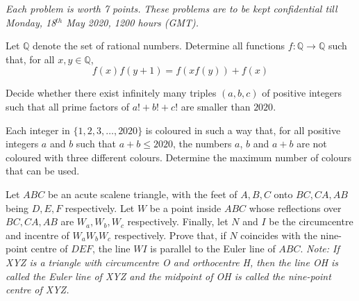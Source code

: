 \documentclass{qmo}
\date{May 17th, 2020}
\begin{document}
\maketitle
\begin{flushright}
\emph{Each problem is worth 7 points.}\nl
\emph{These problems are to be kept confidential till Monday, 18$^\mathit{th}$ May 2020, 1200 hours (GMT).}
\end{flushright}
\setcounter{problem}{4}
\begin{problem}
	Let $\mathbb{Q}$ denote the set of rational numbers. Determine all functions $f\colon \mathbb{Q}\to \mathbb{Q}$ such that, for all $x,y\in \mathbb{Q}$,
	\[f(x) f(y + 1) = f(x f(y)) + f(x)\]
\end{problem}

\begin{problem}	
	Decide whether there exist infinitely many triples $(a,b,c)$ of positive integers such that all prime factors of $a!+b!+c!$ are smaller than $2020$.
\end{problem}

\begin{problem}
	Each integer in $\{1, 2, 3, \ldots, 2020\}$ is coloured in such a way that, for all positive integers $a$ and $b$ such that $a+b \leq 2020$, the numbers $a$, $b$ and $a+b$ are not coloured with three different colours. Determine the maximum number of colours that can be used.
\end{problem}

\begin{problem}
Let $ABC$ be an acute scalene triangle, with the feet of $A, B, C$ onto $BC, CA, AB$ being $D, E, F$ respectively. Let $W$ be a point inside $ABC$ whose reflections over $BC, CA, AB$ are $W_a, W_b, W_c$ respectively. Finally, let $N$ and $I$ be the circumcentre and incentre of $W_aW_bW_c$ respectively. Prove that, if $N$ coincides with the nine-point centre of $DEF$, the line $WI$ is parallel to the Euler line of $ABC$.\nl
\emph{Note: If XYZ is a triangle with circumcentre O and orthocentre H, then the line OH is called the Euler line of XYZ and the midpoint of OH is called the nine-point centre of XYZ.}

\end{problem}
\end{document}
